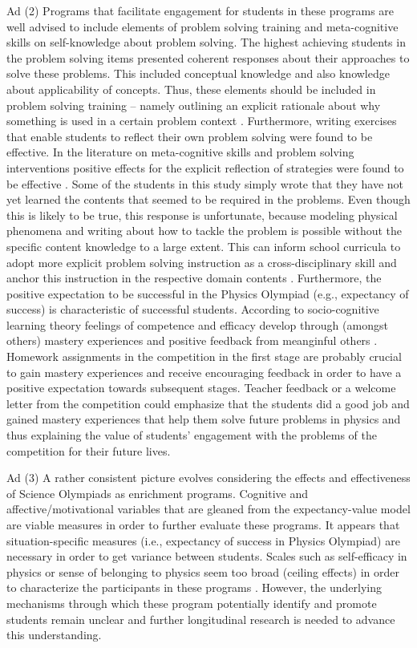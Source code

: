 \documentclass[]{interact}
\begin{document}
Ad (2) Programs that facilitate engagement for students in these programs are well advised to include elements of problem solving training and meta-cognitive skills on self-knowledge about problem solving. The highest achieving students in the problem solving items presented coherent responses about their approaches to solve these problems. This included conceptual knowledge and also knowledge about applicability of concepts. Thus, these elements should be included in problem solving training -- namely outlining an explicit rationale about why something is used in a certain problem context \citep{Fortus.2009}. Furthermore, writing exercises that enable students to reflect their own problem solving were found to be effective. In the literature on meta-cognitive skills and problem solving interventions positive effects for the explicit reflection of strategies were found to be effective \citep[e.g.,][]{Bransford.1986,Mason.2010,Perels.2005}. Some of the students in this study simply wrote that they have not yet learned the contents that seemed to be required in the problems. Even though this is likely to be true, this response is unfortunate, because modeling physical phenomena and writing about how to tackle the problem is possible without the specific content knowledge to a large extent. This can inform school curricula to adopt more explicit problem solving instruction as a cross-disciplinary skill and anchor this instruction in the respective domain contents \citep{Mayer.2013,Nickerson.1994}. Furthermore, the positive expectation to be successful in the Physics Olympiad (e.g., expectancy of success) is characteristic of successful students. According to socio-cognitive learning theory feelings of competence and efficacy develop through (amongst others) mastery experiences and positive feedback from meanginful others \citep{Bandura.2001}. Homework assignments in the competition in the first stage are probably crucial to gain mastery experiences and receive encouraging feedback in order to have a positive expectation towards subsequent stages. Teacher feedback or a welcome letter from the competition could emphasize that the students did a good job and gained mastery experiences that help them solve future problems in physics and thus explaining the value of students' engagement with the problems of the competition for their future lives.

Ad (3) A rather consistent picture evolves considering the effects and effectiveness of Science Olympiads as enrichment programs. Cognitive and affective/motivational variables that are gleaned from the expectancy-value model are viable measures in order to further evaluate these programs. It appears that situation-specific measures (i.e., expectancy of success in Physics Olympiad) are necessary in order to get variance between students. Scales such as self-efficacy in physics or sense of belonging to physics seem too broad (ceiling effects) in order to characterize the participants in these programs \citep[see also:][]{Rabe.2012}. However, the underlying mechanisms through which these program potentially identify and promote students remain unclear and further longitudinal research is needed to advance this understanding.
\end{document}

